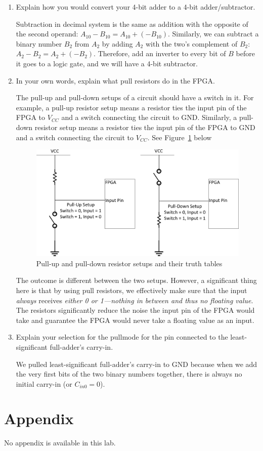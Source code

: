 \documentclass[12pt]{article}
\begin{document}
\begin{enumerate}
    \item Explain how you would convert your 4-bit adder to a 4-bit adder/subtractor.

    Subtraction in decimal system is the same as addition with the opposite of the second operand: $A_{10} - B_{10} = A_{10} + (-B_{10})$. Similarly, we can subtract a binary number $B_2$ from $A_2$ by adding $A_2$ with the two's complement of $B_2$: $A_2 - B_2 = A_2 + (-B_2)$. Therefore, add an inverter to every bit of $B$ before it goes to a logic gate, and we will have a 4-bit subtractor.

    \item In your own words, explain what pull resistors do in the FPGA.

    The pull-up and pull-down setups of a circuit should have a switch in it. For example, a pull-up resistor setup means a resistor ties the input pin of the FPGA to $V_{CC}$ and a switch connecting the circuit to GND. Similarly, a pull-down resistor setup means a resistor ties the input pin of the FPGA to GND and a switch connecting the circuit to $V_{CC}$. See Figure~\ref{figure:5} below

    \begin{figure}[h]
        \centering
        \includegraphics[width=\textwidth]{pull_resistor_setups.png}
        \caption{Pull-up and pull-down resistor setups and their truth tables}
        \label{figure:5}
    \end{figure}

    The outcome is different between the two setups. However, a significant thing here is that by using pull resistors, we effectively make sure that the input \textit{always} receives \textit{either 0 or 1---nothing in between and thus no floating value}. The resistors significantly reduce the noise the input pin of the FPGA would take and guarantee the FPGA would never take a floating value as an input.

    \item Explain your selection for the pullmode for the pin connected to the least-significant full-adder's carry-in.

    We pulled least-significant full-adder's carry-in to GND because when we add the very first bits of the two binary numbers together, there is always no initial carry-in (or $C_{in0} = 0$).
\end{enumerate}

\section*{Appendix}

No appendix is available in this lab.
\end{document}

